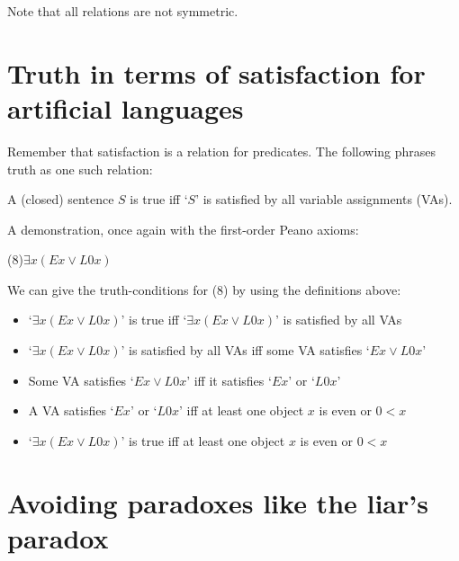 Note that all relations are not symmetric.

\section{Truth in terms of satisfaction for artificial languages}

Remember that satisfaction is a relation for predicates. The following phrases truth as one such relation:

\begin{definition}
A (closed) sentence $S$ is true iff `$S$' is satisfied by all variable assignments (VAs).
\end{definition}

A demonstration, once again with the first-order Peano axioms:

\begin{slide}
(8)\quad $\exists x (Ex \vee L0x)$

\smallskip
We can give the truth-conditions for (8) by using the definitions above:
\begin{itemize}
  \item `$\exists x (Ex \vee L0x)$' is true iff `$\exists x (Ex \vee L0x)$' is satisfied by all VAs
  \item `$\exists x (Ex \vee L0x)$' is satisfied by all VAs iff some VA satisfies `$Ex \vee L0x$'
  \item Some VA satisfies `$Ex \vee L0x$' iff it satisfies `$Ex$' or `$L0x$'
  \item A VA satisfies `$Ex$' or `$L0x$' iff at least one object $x$ is even or $0 < x$
  \item `$\exists x (Ex \vee L0x)$' is true iff at least one object $x$ is even or $0 < x$
\end{itemize}
\end{slide}

\section{Avoiding paradoxes like the liar's paradox}


